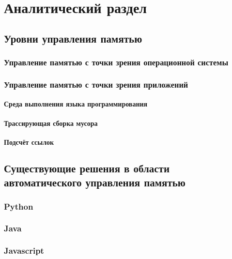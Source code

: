 \chapter{Аналитический раздел}



\section{Уровни управления памятью}

\subsection{Управление памятью с точки зрения операционной системы}

\subsection{Управление памятью с точки зрения приложений}

\subsubsection{Среда выполнения языка программирования}

\subsubsection{Трассирующая сборка мусора}

\subsubsection{Подсчёт ссылок}



\section{Существующие решения в области автоматического управления памятью}

\subsection{Python}

\subsection{Java}

\subsection{Javascript}

